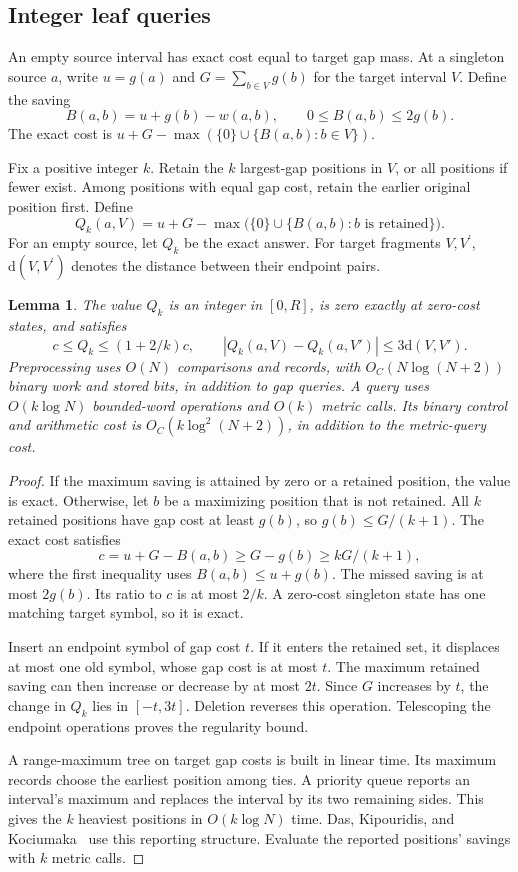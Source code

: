 \documentclass[11pt]{article}
\newtheorem{lemma}[theorem]{Lemma}
\theoremstyle{definition}
\newcommand{\dd}{\mathrm d}
\newcommand{\1}{\mathbf 1}
\begin{document}
\subsection{Integer leaf queries}

An empty source interval has exact cost equal to target gap mass. At a singleton source $a$, write $u=g(a)$ and $G=\sum_{b\in V}g(b)$ for the target interval $V$. Define the saving
\[
 B(a,b)=u+g(b)-w(a,b),\qquad 0\le B(a,b)\le2g(b).
\]
The exact cost is $u+G-\max(\{0\}\cup\{B(a,b):b\in V\})$.

Fix a positive integer $k$.
Retain the $k$ largest-gap positions in $V$, or all positions if fewer exist.
Among positions with equal gap cost, retain the earlier original
position first.
Define
\[
 Q_k(a,V)=u+G-\max\bigl(\{0\}\cup\{B(a,b):b\text{ is retained}\}\bigr).
\]
For an empty source, let $Q_k$ be the exact answer.
For target fragments $V,V^{\prime}$, $\dd(V,V^{\prime})$ denotes the distance between their endpoint pairs.

\begin{lemma}\label{refine:lem:leaves}
The value $Q_k$ is an integer in $[0,R]$, is zero exactly at zero-cost states, and satisfies
\[
 c\le Q_k\le(1+2/k)c,\qquad
 |Q_k(a,V)-Q_k(a,V')|\le3\dd(V,V').
\]
Preprocessing uses $O(N)$ comparisons and records, with
$O_C(N\log(N+2))$ binary work and stored bits, in addition to gap queries.
A query uses $O(k\log N)$ bounded-word operations and $O(k)$ metric calls.
Its binary control and arithmetic cost is
$O_C(k\log^2(N+2))$, in addition to the metric-query cost.
\end{lemma}
\begin{proof}
If the maximum saving is attained by zero or a retained position, the
value is exact. Otherwise, let $b$ be a maximizing position that is not retained.
All $k$ retained positions have gap cost at least $g(b)$,
so $g(b)\le G/(k+1)$. The exact cost satisfies
\[
 c=u+G-B(a,b)\ge G-g(b)\ge kG/(k+1),
\]
where the first inequality uses $B(a,b)\le u+g(b)$.
The missed saving is at most $2g(b)$.
Its ratio to $c$ is at most $2/k$.
A zero-cost singleton state has one matching target symbol, so it is exact.

Insert an endpoint symbol of gap cost $t$.
If it enters the retained set, it displaces at most one old symbol,
whose gap cost is at most $t$.
The maximum retained saving can then increase or decrease by at most
$2t$. Since $G$ increases by $t$, the change in $Q_k$ lies in $[-t,3t]$.
Deletion reverses this operation.
Telescoping the endpoint operations proves the regularity bound.

A range-maximum tree on target gap costs is built in linear time.
Its maximum records choose the earliest position among ties.
A priority queue reports an interval's maximum and replaces the
interval by its two remaining sides.
This gives the $k$ heaviest positions in $O(k\log N)$ time.
Das, Kipouridis, and Kociumaka~\cite{dkk} use this reporting structure.
Evaluate the reported positions' savings with $k$ metric calls.
\end{proof}
\end{document}
